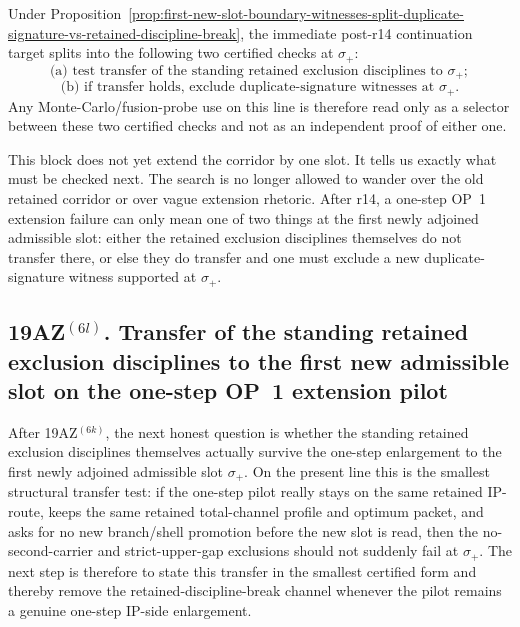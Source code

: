 \begin{corollary}
\label{cor:immediate-post-r14-continuation-target-one-step-op1-extension-pilot}
Under Proposition~\ref{prop:first-new-slot-boundary-witnesses-split-duplicate-signature-vs-retained-discipline-break}, the immediate post-r14 continuation target splits into the following two certified checks at $\sigma_{+}$:
\[
\text{(a) test transfer of the standing retained exclusion disciplines to } \sigma_{+};
\]
\[
\text{(b) if transfer holds, exclude duplicate-signature witnesses at } \sigma_{+}.
\]
Any Monte-Carlo/fusion-probe use on this line is therefore read only as a selector between these two certified checks and not as an independent proof of either one.
\end{corollary}

\begin{remark}
\label{rem:what-first-channel-split-at-new-slot-buys}
This block does not yet extend the corridor by one slot. It tells us exactly what must be checked next. The search is no longer allowed to wander over the old retained corridor or over vague extension rhetoric. After r14, a one-step OP~1 extension failure can only mean one of two things at the first newly adjoined admissible slot: either the retained exclusion disciplines themselves do not transfer there, or else they do transfer and one must exclude a new duplicate-signature witness supported at $\sigma_{+}$.
\end{remark}





\subsection*{19AZ$^{(6l)}$. Transfer of the standing retained exclusion disciplines to the first new admissible slot on the one-step OP~1 extension pilot}
\label{sec:transfer-standing-retained-exclusion-disciplines-first-new-slot-one-step-op1-pilot}
After 19AZ$^{(6k)}$, the next honest question is whether the standing retained exclusion disciplines themselves actually survive the one-step enlargement to the first newly adjoined admissible slot $\sigma_{+}$. On the present line this is the smallest structural transfer test: if the one-step pilot really stays on the same retained IP-route, keeps the same retained total-channel profile and optimum packet, and asks for no new branch/shell promotion before the new slot is read, then the no-second-carrier and strict-upper-gap exclusions should not suddenly fail at $\sigma_{+}$. The next step is therefore to state this transfer in the smallest certified form and thereby remove the retained-discipline-break channel whenever the pilot remains a genuine one-step IP-side enlargement.


